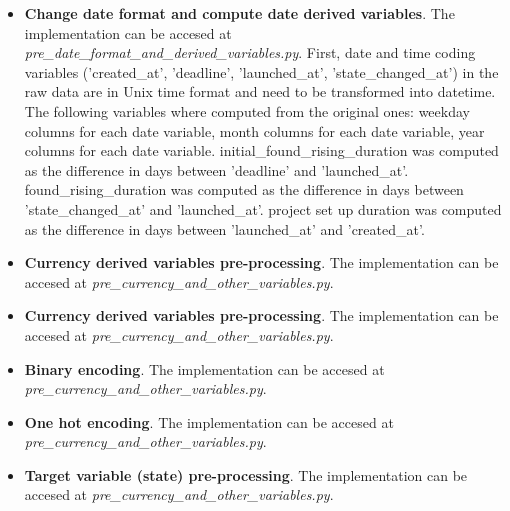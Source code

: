 \documentclass{article}
\begin{document}
{\begin{itemize}
\begin{itemize}
\begin{itemize}
            \item The rest of the profile related columns are going to be coded in a binary choice variable (missing value = 0= , variable contains a project creator provided value =1). The following columns were processed: 'profile\_name', 'profile\_blurb', 'profile\_background\_color', 'profile\_text\_color', 'profile\_link\_background\_color', 'profile\_link\_text\_color', 'profile\_link\_text', 'profile\_link\_url'.
        \end{itemize}
	\item One hot encoding of categorical variables while keeping the original columns for EDA, see section \ref{subsec:EDA}.
        The variables 'category\_name', 'category\_parent\_name', 'location\_expanded\_country' were codified using pd.get\_dummies and the argument drop\_first was set to True.
   \end{itemize}
   \item \textbf{Change date format and compute date derived variables}.
    The implementation can be accesed at \emph{pre\_date\_format\_and\_derived\_variables.py}.
    First, date and time coding variables ('created\_at', 'deadline', 'launched\_at', 'state\_changed\_at') in the raw data are in Unix time format and need to be transformed into datetime. The following variables where computed from the original ones: weekday columns for each date variable, month columns for each date variable, year columns for each date variable.
    initial\_found\_rising\_duration was computed as the difference in days between 'deadline' and 'launched\_at'.
    found\_rising\_duration was computed as the difference in days between 'state\_changed\_at' and 'launched\_at'.
    project set up duration was computed as the difference in days between 'launched\_at' and 'created\_at'.
    
    \item \textbf{Currency derived variables pre-processing}.
    The implementation can be accesed at \emph{pre\_currency\_and\_other\_variables.py}.
    
    \item \textbf{Currency derived variables pre-processing}.
    The implementation can be accesed at \emph{pre\_currency\_and\_other\_variables.py}.
    
    \item \textbf{Binary encoding}.
    The implementation can be accesed at \emph{pre\_currency\_and\_other\_variables.py}.
    
    \item \textbf{One hot encoding}.
    The implementation can be accesed at \emph{pre\_currency\_and\_other\_variables.py}.
    \item \textbf{Target variable (state) pre-processing}.
    The implementation can be accesed at \emph{pre\_currency\_and\_other\_variables.py}.
    

\end{itemize}}
\end{document}
